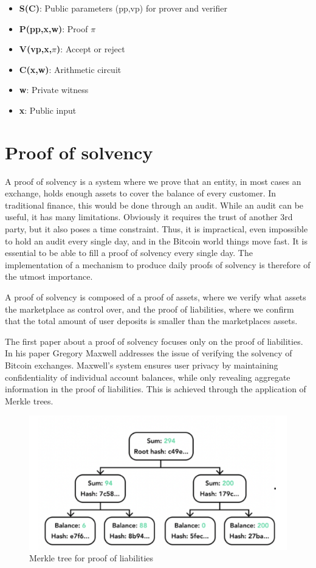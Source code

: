 \begin{itemize}
\item \textbf{S(C)}: Public parameters (pp,vp) for prover and verifier
\item \textbf{P(pp,x,w)}: Proof $\pi$
\item \textbf{V(vp,x,$\pi$)}: Accept or reject
\item \textbf{C(x,w)}: Arithmetic circuit
\item \textbf{w}: Private witness
\item \textbf{x}: Public input
\end{itemize}
\fi

\section{Proof of solvency}

A proof of solvency is a system where we prove that an entity, in most cases an exchange, holds enough assets to cover
the balance of every customer. In traditional finance, this would be done through an audit. While an audit can be useful,
it has many limitations. Obviously it requires the trust of another 3rd party, but it also poses a time constraint. Thus, it is impractical, even impossible
to hold an audit every single day, and in the Bitcoin world things move fast. It is essential to be able to fill a proof of solvency every single day.
The implementation of a mechanism to produce daily proofs of solvency is therefore of the utmost importance.

A proof of solvency is composed of a proof of assets, where we verify what assets the marketplace as control over, and the proof of liabilities,
where we confirm that the total amount of user deposits is smaller than the marketplaces assets.

The first paper about a proof of solvency focuses only on the proof of liabilities. In his paper Gregory Maxwell addresses the issue of verifying
the solvency of Bitcoin exchanges. \cite{chainlink_blog}
Maxwell's system ensures user privacy by maintaining confidentiality of individual account balances, while only revealing aggregate information in the proof of liabilities.
This is achieved through the application of Merkle trees.


\begin{figure}[H]
   \centering
   \includegraphics[width=130mm]{MerkleTreeLiabilities.png}
   \caption{Merkle tree for proof of liabilities}
   \label{overflow}
   \end{figure}


